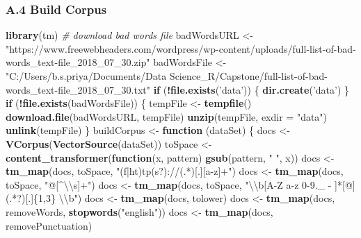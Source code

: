 \documentclass[]{article}
\newenvironment{Shaded}{\begin{snugshade}}{\end{snugshade}}
\newcommand{\CharTok}[1]{\textcolor[rgb]{0.31,0.60,0.02}{#1}}
\newcommand{\CommentTok}[1]{\textcolor[rgb]{0.56,0.35,0.01}{\textit{#1}}}
\newcommand{\ControlFlowTok}[1]{\textcolor[rgb]{0.13,0.29,0.53}{\textbf{#1}}}
\newcommand{\DataTypeTok}[1]{\textcolor[rgb]{0.13,0.29,0.53}{#1}}
\newcommand{\KeywordTok}[1]{\textcolor[rgb]{0.13,0.29,0.53}{\textbf{#1}}}
\newcommand{\NormalTok}[1]{#1}
\newcommand{\OperatorTok}[1]{\textcolor[rgb]{0.81,0.36,0.00}{\textbf{#1}}}
\newcommand{\StringTok}[1]{\textcolor[rgb]{0.31,0.60,0.02}{#1}}
\begin{document}
\hypertarget{a.4-build-corpus}{%
\subsubsection{A.4 Build Corpus}\label{a.4-build-corpus}}

\begin{Shaded}
\begin{Highlighting}[]
\KeywordTok{library}\NormalTok{(tm)}
\CommentTok{# download bad words file}
\NormalTok{badWordsURL <-}\StringTok{ "https://www.freewebheaders.com/wordpress/wp-content/uploads/full-list-of-bad-words_text-file_2018_07_30.zip"}
\NormalTok{badWordsFile <-}\StringTok{ "C:/Users/b.s.priya/Documents/Data Science_R/Capstone/full-list-of-bad-words_text-file_2018_07_30.txt"}
\ControlFlowTok{if}\NormalTok{ (}\OperatorTok{!}\KeywordTok{file.exists}\NormalTok{(}\StringTok{'data'}\NormalTok{)) \{}
  \KeywordTok{dir.create}\NormalTok{(}\StringTok{'data'}\NormalTok{)}
\NormalTok{\}}
\ControlFlowTok{if}\NormalTok{ (}\OperatorTok{!}\KeywordTok{file.exists}\NormalTok{(badWordsFile)) \{}
\NormalTok{  tempFile <-}\StringTok{ }\KeywordTok{tempfile}\NormalTok{()}
  \KeywordTok{download.file}\NormalTok{(badWordsURL, tempFile)}
  \KeywordTok{unzip}\NormalTok{(tempFile, }\DataTypeTok{exdir =} \StringTok{"data"}\NormalTok{)}
  \KeywordTok{unlink}\NormalTok{(tempFile)}
\NormalTok{\}}
\NormalTok{buildCorpus <-}\StringTok{ }\ControlFlowTok{function}\NormalTok{ (dataSet) \{}
\NormalTok{  docs <-}\StringTok{ }\KeywordTok{VCorpus}\NormalTok{(}\KeywordTok{VectorSource}\NormalTok{(dataSet))}
\NormalTok{  toSpace <-}\StringTok{ }\KeywordTok{content_transformer}\NormalTok{(}\ControlFlowTok{function}\NormalTok{(x, pattern) }\KeywordTok{gsub}\NormalTok{(pattern, }\StringTok{" "}\NormalTok{, x))}
\NormalTok{  docs <-}\StringTok{ }\KeywordTok{tm_map}\NormalTok{(docs, toSpace, }\StringTok{"(f|ht)tp(s?)://(.*)[.][a-z]+"}\NormalTok{)}
\NormalTok{  docs <-}\StringTok{ }\KeywordTok{tm_map}\NormalTok{(docs, toSpace, }\StringTok{"@[^}\CharTok{\textbackslash{}\textbackslash{}}\StringTok{s]+"}\NormalTok{)}
\NormalTok{  docs <-}\StringTok{ }\KeywordTok{tm_map}\NormalTok{(docs, toSpace, }\StringTok{"}\CharTok{\textbackslash{}\textbackslash{}}\StringTok{b[A-Z a-z 0-9._ - ]*[@](.*?)[.]\{1,3\} }\CharTok{\textbackslash{}\textbackslash{}}\StringTok{b"}\NormalTok{)}
\NormalTok{  docs <-}\StringTok{ }\KeywordTok{tm_map}\NormalTok{(docs, tolower)}
\NormalTok{  docs <-}\StringTok{ }\KeywordTok{tm_map}\NormalTok{(docs, removeWords, }\KeywordTok{stopwords}\NormalTok{(}\StringTok{"english"}\NormalTok{))}
\NormalTok{  docs <-}\StringTok{ }\KeywordTok{tm_map}\NormalTok{(docs, removePunctuation)}

\end{Highlighting}
\end{Shaded}
\end{document}
